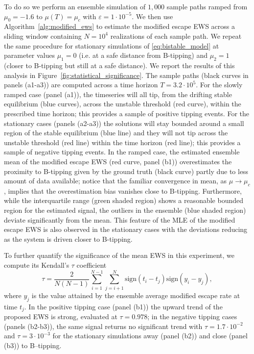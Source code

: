 \documentclass[a4paper,fleqn]{cas-sc}
\newcommand{\fref}[1]{Figure~\ref{#1}}
\begin{document}
To do so we perform an ensemble simulation of $1{,}000$ sample paths ramped from $\mu_0=-1.6$ to $\mu(T)=\mu_c$ with $\varepsilon=1\cdot10^{-5}$.
We then use Algorithm~\ref{alg:modified_ews} to estimate the modified escape EWS across a sliding window containing $N=10^4$ realizations of each sample path.
We repeat the same procedure for stationary simulations of \eqref{eq:bistable_model} at parameter values $\mu_1=0$ (i.e. at a safe distance from B-tipping) and $\mu_2=1$ (closer to B-tipping but still at a safe distance).
We report the results of this analysis in \fref{fig:statistical_significance}.
The sample paths (black curves in panels (a1-a3)) are computed across a time horizon $T=3.2\cdot10^5$. 
For the slowly ramped case (panel (a1)), the timeseries will all tip, from the drifting stable equilibrium (blue curves), across the unstable threshold (red curve), within the prescribed time horizon; this provides a sample of positive tipping events.
For the stationary cases (panels (a2-a3)) the solutions will stay bounded around a small region of the stable equilibrium (blue line) and they will not tip across the unstable threshold (red line) within the time horizon (red line); this provides a sample of negative tipping events.
In the ramped case, the estimated ensemble mean of the modified escape EWS (red curve, panel (b1)) overestimates the proximity to B-tipping given by the ground truth (black curve) partly due to less amount of data available; notice that the familiar convergence in mean, as $\mu\to\mu_c$, implies that the overestimation bias vanishes close to B-tipping.
Furthermore, while the interquartile range (green shaded region) shows a reasonable bounded region for the estimated signal, the outliers in the ensemble (blue shaded region) deviate significantly from the mean.
This feature of the MLE of the modified escape EWS is also observed in the stationary cases with the deviations reducing as the system is driven closer to B-tipping.

To further quantify the significance of the mean EWS in this experiment, we compute its Kendall's $\tau$ coefficient \cite{Kendall1938}
%
\begin{equation}\label{eq:kendall_tau}
  \tau = \frac{2}{N(N-1)}\sum_{i=1}^{N-1}\sum_{j=i+1}^{N}\text{sign}(t_i - t_j)\text{sign}(y_i - y_j),
\end{equation}
%
where $y_j$ is the value attained by the ensemble average modified escape rate at time $t_j$.
In the positive tipping case (panel (b1)) the upward trend of the proposed EWS is strong, evaluated at $\tau=0.978$; in the negative tipping cases (panels (b2-b3)), the same signal returns no significant trend with $\tau=1.7\cdot10^{-2}$ and $\tau=3\cdot10^{-3}$ for the stationary simulations away (panel (b2)) and close (panel (b3)) to B--tipping.
\end{document}
